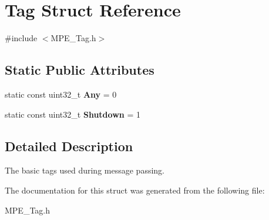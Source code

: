 \hypertarget{struct_tag}{}\section{Tag Struct Reference}
\label{struct_tag}


{\ttfamily \#include $<$M\+P\+E\+\_\+\+Tag.\+h$>$}

\subsection*{Static Public Attributes}
\begin{DoxyCompactItemize}
\item 
\mbox{\label{struct_tag_a912b98789132f59ca299c8a98d649a16}} 
static const uint32\+\_\+t {\bfseries Any} = 0
\item 
\mbox{\label{struct_tag_a92d980ab77af22009b018f020cf39d23}} 
static const uint32\+\_\+t {\bfseries Shutdown} = 1
\end{DoxyCompactItemize}


\subsection{Detailed Description}
The basic tags used during message passing. 

The documentation for this struct was generated from the following file\+:\begin{DoxyCompactItemize}
\item 
M\+P\+E\+\_\+\+Tag.\+h\end{DoxyCompactItemize}
